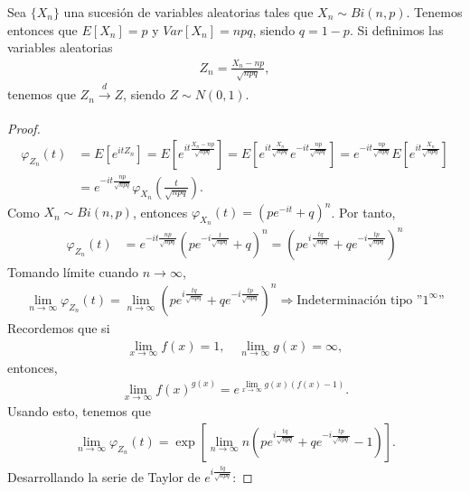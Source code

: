 \begin{obs}
Sea $\{X_n\}$ una sucesión de variables aleatorias tales que $X_n \sim Bi(n,p)$. Tenemos entonces que $E[X_n] = p$ y $Var[X_n] = npq$, siendo $q = 1 - p$. Si definimos las variables aleatorias 
\begin{align*}
    Z_n = \frac{X_n - np}{\sqrt{npq}},
\end{align*}
tenemos que $Z_n \xrightarrow[]{d} Z$, siendo $Z \sim N(0,1)$.
\begin{proof}
    \begin{align*}
        \varphi_{Z_n}(t) &= E \left[ e^{itZ_n} \right] = E \left[ e^{it\frac{X_n - np}{\sqrt{npq}}} \right] = E \left[ e^{it\frac{X_n}{\sqrt{npq}}} e^{-it\frac{np}{\sqrt{npq}}} \right] = e^{-it\frac{np}{\sqrt{npq}}} E \left[ e^{it\frac{X_n}{\sqrt{npq}}} \right]  \\
        &= e^{-it\frac{np}{\sqrt{npq}}} \varphi_{X_n}\left( \frac{t}{\sqrt{npq}} \right) .
    \end{align*} 
    Como $X_n \sim Bi(n,p)$, entonces $\varphi_{X_n}(t) = \left( pe^{-it} + q \right)^n$. Por tanto,
    \begin{align*}
        \varphi_{Z_n}(t) &= e^{-it\frac{np}{\sqrt{npq}}} \left( pe^{-i \frac{t}{\sqrt{npq}}} + q \right)^n = \left( pe^{i\frac{tq}{\sqrt{npq}}} + qe^{-i\frac{tp}{\sqrt{npq}}} \right)^n
    \end{align*}
    Tomando límite cuando $n \to \infty$,
    \begin{align*}
        \lim_{n \to \infty} \varphi_{Z_n}(t) = \lim_{n \to \infty} \left( pe^{i\frac{tq}{\sqrt{npq}}} + qe^{-i\frac{tp}{\sqrt{npq}}} \right)^n \Longrightarrow \text{Indeterminación tipo ''$1^{\infty}$''}
    \end{align*}
    Recordemos que si
    \begin{align*}
        \lim_{x \to \infty} f(x) = 1, \quad \lim_{n \to \infty} g(x) = \infty,
    \end{align*}
    entonces,
    \begin{align*}
        \lim_{x \to \infty} f(x)^{g(x)} = e^{\lim_{x \to \infty} g(x)(f(x) - 1)}.
    \end{align*}
    Usando esto, tenemos que
    \begin{align*}
        \lim_{n \to \infty} \varphi_{Z_n}(t) = \exp\left[ \lim_{n \to \infty} n\left(pe^{i\frac{tq}{\sqrt{npq}}} + qe^{-i\frac{tp}{\sqrt{npq}}} - 1 \right) \right].
    \end{align*}
    Desarrollando la serie de Taylor de $e^{i\frac{tq}{\sqrt{npq}}}$:

\end{proof}
\end{obs}
